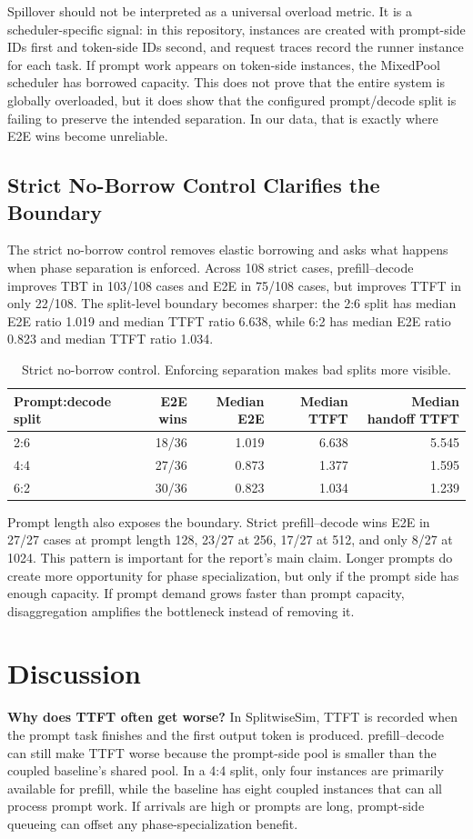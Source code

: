 \documentclass[10pt]{article}
\newcommand{\pd}{prefill--decode}
\begin{document}
Spillover should not be interpreted as a universal overload metric. It is a scheduler-specific signal: in this repository, instances are created with prompt-side IDs first and token-side IDs second, and request traces record the runner instance for each task. If prompt work appears on token-side instances, the MixedPool scheduler has borrowed capacity. This does not prove that the entire system is globally overloaded, but it does show that the configured prompt/decode split is failing to preserve the intended separation. In our data, that is exactly where E2E wins become unreliable.

\subsection{Strict No-Borrow Control Clarifies the Boundary}
The strict no-borrow control removes elastic borrowing and asks what happens when phase separation is enforced. Across 108 strict cases, \pd{} improves TBT in 103/108 cases and E2E in 75/108 cases, but improves TTFT in only 22/108. The split-level boundary becomes sharper: the 2:6 split has median E2E ratio 1.019 and median TTFT ratio 6.638, while 6:2 has median E2E ratio 0.823 and median TTFT ratio 1.034.

\begin{table}[t]
\centering
\small
\caption{Strict no-borrow control. Enforcing separation makes bad splits more visible.}
\label{tab:strict-summary}
\begin{tabular}{lrrrr}
\toprule
Prompt:decode split & E2E wins & Median E2E & Median TTFT & Median handoff TTFT \\
\midrule
2:6 & 18/36 & 1.019 & 6.638 & 5.545 \\
4:4 & 27/36 & 0.873 & 1.377 & 1.595 \\
6:2 & 30/36 & 0.823 & 1.034 & 1.239 \\
\bottomrule
\end{tabular}
\end{table}

Prompt length also exposes the boundary. Strict \pd{} wins E2E in 27/27 cases at prompt length 128, 23/27 at 256, 17/27 at 512, and only 8/27 at 1024. This pattern is important for the report's main claim. Longer prompts do create more opportunity for phase specialization, but only if the prompt side has enough capacity. If prompt demand grows faster than prompt capacity, disaggregation amplifies the bottleneck instead of removing it.

\section{Discussion}
\textbf{Why does TTFT often get worse?} In SplitwiseSim, TTFT is recorded when the prompt task finishes and the first output token is produced. \pd{} can still make TTFT worse because the prompt-side pool is smaller than the coupled baseline's shared pool. In a 4:4 split, only four instances are primarily available for prefill, while the baseline has eight coupled instances that can all process prompt work. If arrivals are high or prompts are long, prompt-side queueing can offset any phase-specialization benefit.
\end{document}
